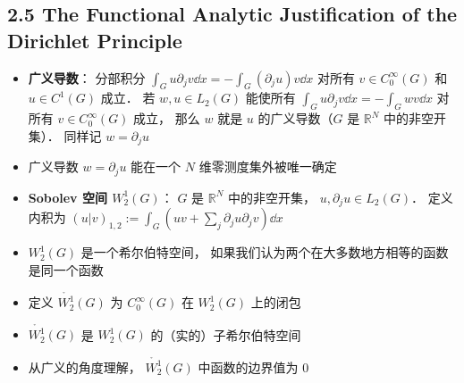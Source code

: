 \subsection{2.5 The Functional Analytic Justification of the Dirichlet Principle}
\begin{itemize}
\item \textbf{广义导数}： 分部积分 $\int_G u\partial_j v\dd{x} = -\int_G (\partial_j u)v\dd{x}$ 对所有 $v \in C_0^\infty(G)$ 和 $u \in C^1(G)$ 成立． 若 $w, u\in L_2(G)$ 能使所有 $\int_G u\partial_j v\dd{x} = -\int_G wv\dd{x}$ 对所有 $v \in C_0^\infty(G)$ 成立， 那么 $w$ 就是 $u$ 的广义导数（$G$ 是 $\mathbb R^N$ 中的非空开集）． 同样记 $w = \partial_j u$

\item 广义导数 $w = \partial_j u$ 能在一个 $N$ 维零测度集外被唯一确定

\item \textbf{Sobolev 空间 $W_2^1(G)$}： $G$ 是 $\mathbb R^N$ 中的非空开集， $u, \partial_ju \in L_2(G)$． 定义内积为 $(u|v)_{1,2} := \int_G(uv + \sum_j \partial_j u\partial_j v) \dd{x}$

\item $W_2^1(G)$ 是一个希尔伯特空间， 如果我们认为两个在大多数地方相等的函数是同一个函数

\item 定义 $\mathring {W_2^1}(G)$ 为 $C_0^\infty(G)$ 在 $W_2^1(G)$ 上的闭包

\item $\mathring {W_2^1}(G)$ 是 $W_2^1(G)$ 的（实的）子希尔伯特空间

\item 从广义的角度理解， $\mathring {W_2^1}(G)$ 中函数的边界值为 0
\end{itemize}

